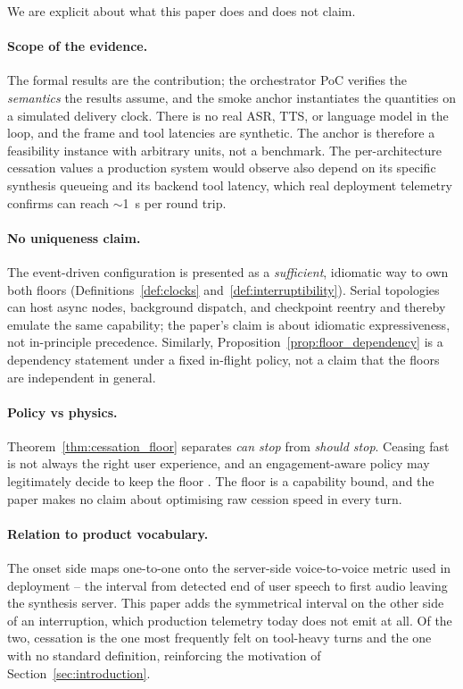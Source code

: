 We are explicit about what this paper does and does not claim.

\paragraph{Scope of the evidence.}
The formal results are the contribution; the orchestrator PoC verifies the \emph{semantics}
the results assume, and the smoke anchor instantiates the quantities on a simulated delivery
clock.
There is no real ASR, TTS, or language model in the loop, and the frame and tool latencies are
synthetic.
The anchor is therefore a feasibility instance with arbitrary units, not a benchmark.
The per-architecture cessation values a production system would observe also depend on its
specific synthesis queueing and its backend tool latency, which real deployment telemetry
confirms can reach $\sim$1~s per round trip.

\paragraph{No uniqueness claim.}
The event-driven configuration is presented as a \emph{sufficient}, idiomatic way to own both
floors (Definitions~\ref{def:clocks} and~\ref{def:interruptibility}).
Serial topologies can host async nodes, background dispatch, and checkpoint reentry and thereby
emulate the same capability; the paper's claim is about idiomatic expressiveness, not
in-principle precedence.
Similarly, Proposition~\ref{prop:floor_dependency} is a dependency statement under a fixed in-flight
policy, not a claim that the floors are independent in general.

\paragraph{Policy vs physics.}
Theorem~\ref{thm:cessation_floor} separates \emph{can stop} from \emph{should stop}.
Ceasing fast is not always the right user experience, and an engagement-aware policy may
legitimately decide to keep the floor \citep{bohus2011interruptions}.
The floor is a capability bound, and the paper makes no claim about optimising raw cession speed
in every turn.

\paragraph{Relation to product vocabulary.}
The onset side maps one-to-one onto the server-side voice-to-voice metric used in deployment --
the interval from detected end of user speech to first audio leaving the synthesis server.
This paper adds the symmetrical interval on the other side of an interruption, which
production telemetry today does not emit at all.
Of the two, cessation is the one most frequently felt on tool-heavy turns and the one with no
standard definition, reinforcing the motivation of Section~\ref{sec:introduction}.

